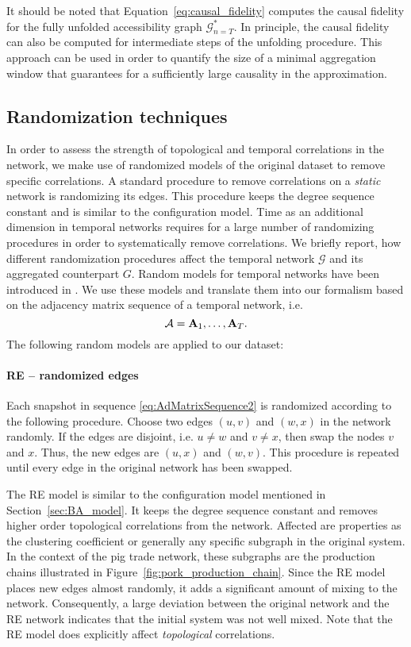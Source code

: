 It should be noted that Equation~\eqref{eq:causal_fidelity} computes the causal fidelity for the fully unfolded accessibility graph $\mathcal{G}^*_{n=T}$.
In principle, the causal fidelity can also be computed for intermediate steps of the unfolding procedure.
This approach can be used in order to quantify the size of a minimal aggregation window that guarantees for a sufficiently large causality in the approximation.

\subsection{Randomization techniques}\label{sec:randomized_models_tvg}
In order to assess the strength of topological and temporal correlations in the network, we make use of randomized models of the original dataset to remove specific correlations.
A standard procedure to remove correlations on a \emph{static} network is randomizing its edges.
This procedure keeps the degree sequence constant and is similar to the configuration model.
Time as an additional dimension in temporal networks requires for a large number of randomizing procedures in order to systematically remove correlations.
We briefly report, how different randomization procedures affect the temporal network $\mathcal{G} $ and its aggregated counterpart $G$.
Random models for temporal networks have been introduced in \citep{Pan:2011dga,Holme_review}.
We use these models and translate them into our formalism based on the adjacency matrix sequence of a temporal network, i.e.
\begin{equation}\label{eq:AdMatrixSequence2}
\mathcal{A}=\mathbf{A}_1,\dots ,\mathbf{A}_T.
\end{equation}
The following random models are applied to our dataset:
%
\paragraph{RE -- randomized edges\color{Cayenne}{.}}
Each snapshot in sequence \eqref{eq:AdMatrixSequence2} is randomized according to the following procedure.
Choose two edges $(u,v)$ and $(w,x)$ in the network randomly.
If the edges are disjoint, i.e. $u\neq w$ and $v\neq x$, then swap the nodes $v$ and $x$.
Thus, the new edges are $(u,x)$ and $(w,v)$.
This procedure is repeated until every edge in the original network has been swapped.

The RE model is similar to the configuration model mentioned in Section~\ref{sec:BA_model}.
It keeps the degree sequence constant and removes higher order topological correlations from the network.
Affected are properties as the clustering coefficient or generally any specific subgraph in the original system.
In the context of the pig trade network, these subgraphs are the production chains illustrated in Figure~\ref{fig:pork_production_chain}.
Since the RE model places new edges almost randomly, it adds a significant amount of mixing to the network.
Consequently, a large deviation between the original network and the RE network indicates that the initial system was not well mixed.
Note that the RE model does explicitly affect \emph{topological} correlations.

